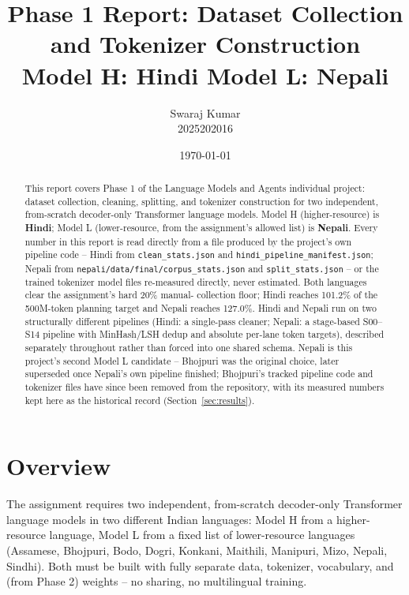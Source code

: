 \documentclass[11pt]{article}
\title{\textbf{Phase 1 Report: Dataset Collection and Tokenizer Construction} \\
\large Model H: Hindi \quad\textbar\quad Model L: Nepali}
\author{Swaraj Kumar \\ \small 2025202016}
\date{\today}
\begin{document}
\maketitle

\begin{abstract}
\noindent
This report covers Phase 1 of the Language Models and Agents individual
project: dataset collection, cleaning, splitting, and tokenizer
construction for two independent, from-scratch decoder-only Transformer
language models. Model H (higher-resource) is \textbf{Hindi}; Model L
(lower-resource, from the assignment's allowed list) is \textbf{Nepali}.
Every number in this report is read directly from a file produced by the
project's own pipeline code -- Hindi from \texttt{clean\_stats.json} and
\texttt{hindi\_pipeline\_manifest.json}; Nepali from
\texttt{nepali/data/final/corpus\_stats.json} and \texttt{split\_stats.json}
-- or the trained tokenizer model files re-measured directly, never
estimated. Both languages clear the assignment's hard 20\% manual-
collection floor; Hindi reaches 101.2\% of the 500M-token planning target
and Nepali reaches 127.0\%. Hindi and Nepali run on two structurally
different pipelines (Hindi: a single-pass cleaner; Nepali: a stage-based
S00--S14 pipeline with MinHash/LSH dedup and absolute per-lane token
targets), described separately throughout rather than forced into one
shared schema. Nepali is this project's second Model L candidate --
Bhojpuri was the original choice, later superseded once Nepali's own
pipeline finished; Bhojpuri's tracked pipeline code and tokenizer files
have since been removed from the repository, with its measured numbers
kept here as the historical record (Section~\ref{sec:results}).
\end{abstract}

\tableofcontents
\newpage

\section{Overview}

The assignment requires two independent, from-scratch decoder-only
Transformer language models in two different Indian languages: Model H
from a higher-resource language, Model L from a fixed list of
lower-resource languages (Assamese, Bhojpuri, Bodo, Dogri, Konkani,
Maithili, Manipuri, Mizo, Nepali, Sindhi). Both must be built with fully
separate data, tokenizer, vocabulary, and (from Phase 2) weights -- no
sharing, no multilingual training.
\end{document}
